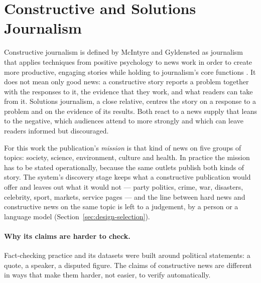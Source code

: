 
\section{Constructive and Solutions Journalism}
\label{sec:constructive-journalism}

Constructive journalism is defined by McIntyre and Gyldensted as
journalism that applies techniques from positive psychology to news
work in order to create more productive, engaging stories while
holding to journalism's core functions \cite{mcintyre2017constructive}.
It does not mean only good news: a constructive story reports a problem
together with the responses to it, the evidence that they work, and
what readers can take from it. Solutions journalism, a close relative,
centres the story on a response to a problem and on the evidence of its
results. Both react to a news supply that leans to the negative, which
audiences attend to more strongly \cite{soroka2015negativity} and which
can leave readers informed but discouraged.

For this work the publication's \emph{mission} is that kind of news on
five groups of topics: society, science, environment, culture and
health. In practice the mission has to be stated operationally, because
the same outlets publish both kinds of story. The system's discovery
stage keeps what a constructive publication would offer and leaves out
what it would not --- party politics, crime, war, disasters, celebrity,
sport, markets, service pages --- and the line between hard news and
constructive news on the same topic is left to a judgement, by a person
or a language model (Section~\ref{sec:design-selection}).

\paragraph{Why its claims are harder to check.} Fact-checking practice
and its datasets were built around political statements: a quote, a
speaker, a disputed figure. The claims of constructive news are
different in ways that make them harder, not easier, to verify
automatically.

